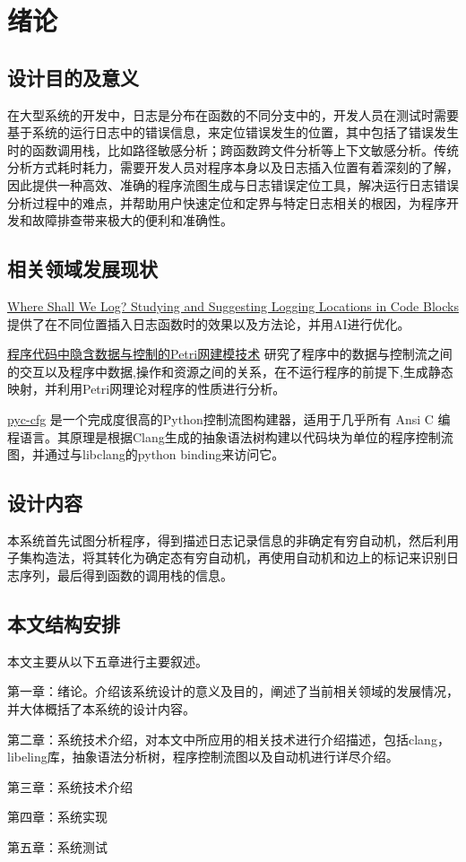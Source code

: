 \chapter{绪论}

\section{设计目的及意义}
在大型系统的开发中，日志是分布在函数的不同分支中的，开发人员在测试时需要基于系统的运行日志中的错误信息，来定位错误发生的位置，其中包括了错误发生时的函数调用栈，比如路径敏感分析；跨函数跨文件分析等上下文敏感分析。传统分析方式耗时耗力，需要开发人员对程序本身以及日志插入位置有着深刻的了解，因此提供一种高效、准确的程序流图生成与日志错误定位工具，解决运行日志错误分析过程中的难点，并帮助用户快速定位和定界与特定日志相关的根因，为程序开发和故障排查带来极大的便利和准确性。


\section{相关领域发展现状}
\href{https://users.encs.concordia.ca/~shang/pubs/Zhenhao_ASE20.pdf}{Where Shall We Log? Studying and Suggesting Logging
Locations in Code Blocks} 提供了在不同位置插入日志函数时的效果以及方法论，并用AI进行优化。

\href{https://doc.taixueshu.com/journal/20110163rjxb.html}{程序代码中隐含数据与控制的Petri网建模技术} 研究了程序中的数据与控制流之间的交互以及程序中数据,操作和资源之间的关系，在不运行程序的前提下,生成静态映射，并利用Petri网理论对程序的性质进行分析。

\href{https://github.com/shramos/pyc-cfg}{pyc-cfg} 是一个完成度很高的Python控制流图构建器，适用于几乎所有 Ansi C 编程语言。其原理是根据Clang生成的抽象语法树构建以代码块为单位的程序控制流图，并通过与libclang的python binding来访问它。
\section{设计内容}
本系统首先试图分析程序，得到描述日志记录信息的非确定有穷自动机，然后利用子集构造法，将其转化为确定态有穷自动机，再使用自动机和边上的标记来识别日志序列，最后得到函数的调用栈的信息。

\section{本文结构安排}
本文主要从以下五章进行主要叙述。

第一章：绪论。介绍该系统设计的意义及目的，阐述了当前相关领域的发展情况，并大体概括了本系统的设计内容。

第二章：系统技术介绍，对本文中所应用的相关技术进行介绍描述，包括clang，libeling库，抽象语法分析树，程序控制流图以及自动机进行详尽介绍。

第三章：系统技术介绍

第四章：系统实现

第五章：系统测试

